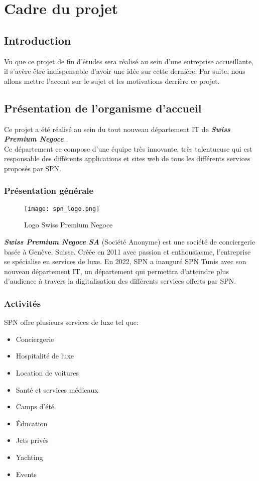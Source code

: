 \chapter{Cadre du projet}
\minitoc
\clearpage
\section*{Introduction}
\small{Vu que ce projet de fin d'études sera réalisé au sein d'une entreprise accueillante, il s'avère être indispensable d'avoir une idée sur cette dernière. Par suite, nous allons mettre l'accent sur le sujet et les motivations derrière ce projet.}
\section{Présentation de l'organisme d'accueil}
Ce projet a été réalisé au sein du tout nouveau département IT de \textit{\textbf{Swiss Premium Negoce}} \cite{spn}.\\
\noindent Ce département ce compose d'une équipe très innovante, très talentueuse qui est responsable des différents applications et sites web de tous les différents services proposés par SPN.
\subsection{Présentation générale}
\vspace{1cm}
\begin{figure}[H]
    \centering
    \texttt{[image: spn\_logo.png]}
    \vspace{0.5cm}
    \caption{Logo Swiss Premium Negoce}
    \label{fig:spn_logo}
\end{figure}
\vspace{1cm}
\textit{\textbf{Swiss Premium Negoce SA}} (Société Anonyme) est une société de conciergerie basée à
Genève, Suisse. Créée en 2011 avec passion et enthousiasme, l'entreprise se spécialise en services de luxe.
En 2022, SPN a inauguré SPN Tunis avec son nouveau département IT, un département qui permettra d'atteindre plus d'audience à travers la digitalisation des différents services offerts par SPN.
\subsection{Activités}
SPN offre plusieurs services de luxe tel que:
\begin{itemize}
    \item Conciergerie
    \item Hospitalité de luxe
    \item Location de voitures
    \item Santé et services médicaux
    \item Camps d'été
    \item Éducation
    \item Jets privés
    \item Yachting
    \item Events
\end{itemize}
